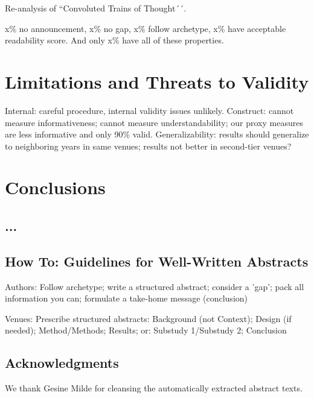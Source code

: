\documentclass[10pt,journal,compsoc]{IEEEtran}
\newcommand{\ifarxiv}[1]{#1}  %
\begin{document}
Re-analysis of ``Convoluted Trains of Thought´´. 

x\% no announcement, x\% no gap, x\% follow archetype, x\% have acceptable readability score.
And only x\% have all of these properties.




\section{Limitations and Threats to Validity}

\noindent
Internal: careful procedure, internal validity issues unlikely.
Construct: cannot measure informativeness; cannot measure understandability;
our proxy measures are less informative and only 90\% valid.
Generalizability: 
results should generalize to neighboring years in same venues;
results not better in second-tier venues?


\section{Conclusions}


\subsection{...}
\noindent


\subsection{How To: Guidelines for Well-Written Abstracts}

\noindent
Authors: Follow archetype; write a structured abstract; consider a 'gap'; pack all information you can; formulate a take-home message (conclusion)

Venues: Prescribe structured abstracts: Background (not Context); Design (if needed); Method/Methods; Results; or: Substudy 1/Substudy 2; Conclusion





\subsection*{Acknowledgments}
\noindent We thank Gesine Milde for cleansing the automatically extracted abstract texts.
	


	


\ifarxiv{}
	
\end{document}
